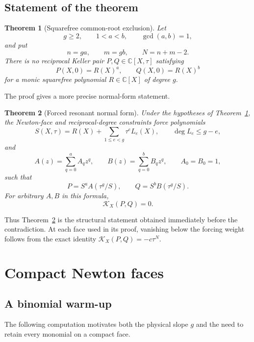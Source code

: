\documentclass[11pt]{article}
\newtheorem{theorem}{Theorem}[section]
\theoremstyle{definition}
\theoremstyle{remark}
\newcommand{\C}{\mathbb C}
\newcommand{\KX}{\mathcal K_X}
\begin{document}
\subsection{Statement of the theorem}

\begin{theorem}[Squarefree common-root exclusion]
\label{thm:main}
Let
\[
 g\geq2,\qquad 1<a<b,\qquad \gcd(a,b)=1,
\]
and put
\[
 n=ga,\qquad m=gb,\qquad N=n+m-2.
\]
There is no reciprocal Keller pair \(P,Q\in\C[X,\tau]\) satisfying
\begin{equation}
 P(X,0)=R(X)^a,\qquad Q(X,0)=R(X)^b
\label{eq:boundary}
\end{equation}
for a monic squarefree polynomial \(R\in\C[X]\) of degree \(g\).
\end{theorem}

The proof gives a more precise normal-form statement.

\begin{theorem}[Forced resonant normal form]
\label{thm:normal-form}
Under the hypotheses of Theorem~\ref{thm:main}, the Newton-face and
reciprocal-degree constraints force polynomials
\[
 S(X,\tau)
 =R(X)+\sum_{1\leq e<g}\tau^eL_e(X),
 \qquad \deg L_e\leq g-e,
\]
and
\[
 A(z)=\sum_{q=0}^{a}A_qz^q,\qquad
 B(z)=\sum_{q=0}^{b}B_qz^q,\qquad A_0=B_0=1,
\]
such that
\begin{equation}
 \boxed{
 P=S^aA(\tau^g/S),\qquad Q=S^bB(\tau^g/S).
 }
\label{eq:normal-form}
\end{equation}
For arbitrary \(A,B\) in this formula,
\[
 \KX(P,Q)=0.
\]
\end{theorem}

Thus Theorem~\ref{thm:normal-form} is the structural statement obtained
immediately before the contradiction.  At each face used in its proof,
vanishing below the forcing weight follows from the exact identity
\(\KX(P,Q)=-c\tau^N\).

\section{Compact Newton faces}
\label{sec:faces}

\subsection{A binomial warm-up}

The following computation motivates both the physical slope \(g\) and
the need to retain every monomial on a compact face.
\end{document}

